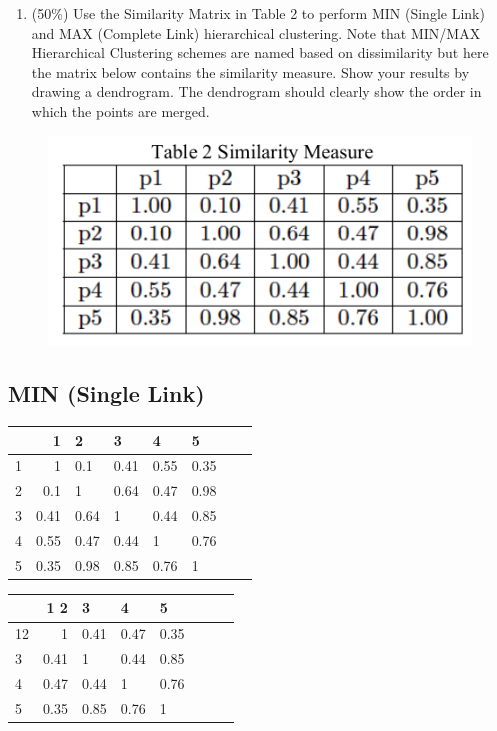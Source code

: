 \documentclass[11pt]{article}
\makeatletter
\def\maxwidth{\ifdim\Gin@nat@width>\linewidth\linewidth
    \else\Gin@nat@width\fi}
\let\Oldincludegraphics\includegraphics
\renewcommand{\includegraphics}[1]{\Oldincludegraphics[width=.8\maxwidth]{#1}}
\providecommand{\tightlist}{%
      \setlength{\itemsep}{0pt}\setlength{\parskip}{0pt}}
\makeatother
\begin{document}
\begin{enumerate}
\def\labelenumi{\arabic{enumi}.}
\setcounter{enumi}{1}
\tightlist
\item
  (50\%) Use the Similarity Matrix in Table 2 to perform MIN (Single
  Link) and MAX (Complete Link) hierarchical clustering. Note that
  MIN/MAX Hierarchical Clustering schemes are named based on
  dissimilarity but here the matrix below contains the similarity
  measure. Show your results by drawing a dendrogram. The dendrogram
  should clearly show the order in which the points are merged.
\end{enumerate}

\begin{figure}[H]
\centering
\includegraphics{2.png}
\caption{}
\end{figure}


\subsection*{MIN (Single Link)}

	\begin{table}[H]
	\centering
    \begin{tabular}{|l|r|l|l|l|l|l|r|}
    	\toprule
    	{} &  1 & 2 &      3 & 4 &        5 \\
    	\midrule
    	1 &  1 & 0.1 & 0.41 &    0.55 & 0.35  \\
    	2 &  0.1 & 1 &    0.64 & 0.47 &  0.98 \\
    	3 &  0.41 & 0.64 &    1 & 0.44 &  0.85 \\
    	4 &  0.55 & 0.47 &    0.44 & 1 &  0.76 \\
    	5 &  0.35 & 0.98 &    0.85 & 0.76 &  1 \\
    	\bottomrule
    \end{tabular}
	\end{table}


	\begin{table}[H]
	\centering
	\begin{tabular}{|l|r|l|l|l|l|l|r|}
		\toprule
		{} &  1 2 &      3 & 4 &        5 \\
		\midrule
		12 &  1 & 0.41 &    0.47 & 0.35  \\
		3 &  0.41 & 1 &   0.44 &  0.85 \\
		4 & 0.47 &    0.44 & 1 &  0.76 \\
		5 &  0.35 &   0.85 & 0.76 &  1 \\
		\bottomrule
	\end{tabular}
\end{table}
\end{document}
